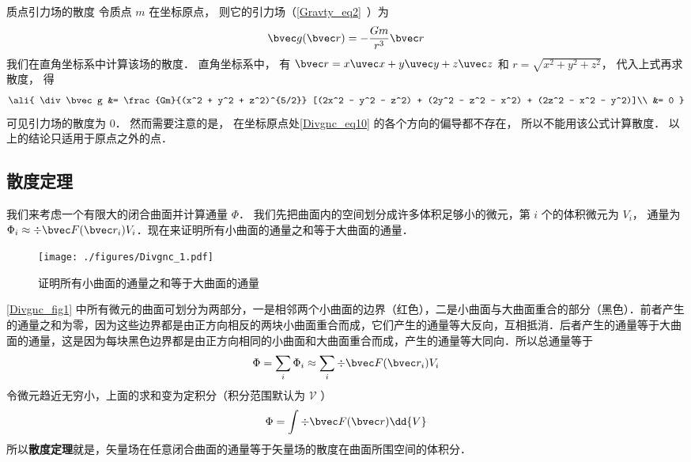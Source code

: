 \begin{example}{质点引力场的散度}
令质点 $m$ 在坐标原点， 则它的引力场（\autoref{Gravty_eq2}~）为
\begin{equation}\label{Divgnc_eq10}
\bvec g(\bvec r) = -\frac{Gm}{r^3}\bvec r
\end{equation}
我们在直角坐标系中计算该场的散度． 直角坐标系中， 有 $\bvec r = x\uvec x + y\uvec y + z\uvec z$ 和 $r = \sqrt{x^2 + y^2 + z^2}$， 代入上式再求散度， 得
\begin{equation}\ali{
\div \bvec g &= \frac{Gm}{(x^2 + y^2 + z^2)^{5/2}} [(2x^2 - y^2 - z^2) + (2y^2 - z^2 - x^2) + (2z^2 - x^2 - y^2)]\\
&= 0
}\end{equation}
可见引力场的散度为 0． 然而需要注意的是， 在坐标原点处\autoref{Divgnc_eq10} 的各个方向的偏导都不存在， 所以不能用该公式计算散度． 以上的结论只适用于原点之外的点．
\end{example}


\subsection{散度定理}

我们来考虑一个有限大的闭合曲面并计算通量 $\Phi$． 我们先把曲面内的空间划分成许多体积足够小的微元，第 $i$ 个的体积微元为 $V_i$， 通量为 $\Phi_i \approx \div \bvec F(\bvec r_i) V_i$．现在来证明所有小曲面的通量之和等于大曲面的通量．
\begin{figure}[ht]
\centering
\texttt{[image: ./figures/Divgnc\_1.pdf]}
\caption{证明所有小曲面的通量之和等于大曲面的通量} \label{Divgnc_fig1}
\end{figure}
\autoref{Divgnc_fig1} 中所有微元的曲面可划分为两部分，一是相邻两个小曲面的边界（红色），二是小曲面与大曲面重合的部分（黑色）．前者产生的通量之和为零，因为这些边界都是由正方向相反的两块小曲面重合而成，它们产生的通量等大反向，互相抵消．后者产生的通量等于大曲面的通量，这是因为每块黑色边界都是由正方向相同的小曲面和大曲面重合而成，产生的通量等大同向．所以总通量等于
\begin{equation}
\Phi  = \sum_i \Phi_i  \approx \sum_i \div \bvec F (\bvec r_i) V_i
\end{equation}
令微元趋近无穷小，上面的求和变为定积分（积分范围默认为 $\mathcal V$ ）
\begin{equation}\label{Divgnc_eq13}
\Phi  = \int \div \bvec F(\bvec r) \dd{V}
\end{equation}
所以\textbf{散度定理}就是，矢量场在任意闭合曲面的通量等于矢量场的散度在曲面所围空间的体积分．



